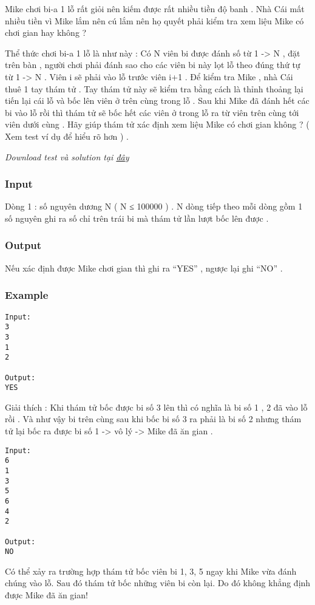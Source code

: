 



   Mike chơi bi-a 1 lỗ rất giỏi nên kiếm được rất nhiều tiền độ banh . Nhà Cái mất nhiều tiền vì Mike lắm nên cú lắm nên họ quyết phải kiểm tra xem liệu Mike có chơi gian hay không ?   


   Thể thức chơi bi-a 1 lỗ là như này : Có N viên bi được đánh số từ 1 -> N , đặt trên bàn , người chơi phải đánh sao cho các viên bi này lọt lỗ theo đúng thứ tự từ 1 -> N . Viên i sẽ phải vào lỗ trước viên i+1 . Để kiểm tra Mike , nhà Cái thuê 1 tay thám tử . Tay thám tử này sẽ kiểm tra bằng cách là thỉnh thoảng lại tiến lại cái lỗ và bốc lên viên ở trên cùng trong lỗ . Sau khi Mike đã đánh hết các bi vào lỗ rồi thì thám tử sẽ bốc hết các viên ở trong lỗ ra từ viên trên cùng tới viên dưới cùng . Hãy giúp thám tử xác định xem liệu Mike có chơi gian không ? ( Xem test ví dụ để hiểu rõ hơn ) .   





\textit{    Download test và solution tại    \href{https://vn.spoj.pl/content/cheat.zip}{     đây    }}

\subsubsection{   Input  }

   Dòng 1 : số nguyên dương N ( N ≤ 100000 ) . N dòng tiếp theo mỗi dòng gồm 1 số nguyên ghi ra số chỉ trên trái bi mà thám tử lần lượt bốc lên được .  

\subsubsection{   Output  }

   Nếu xác định được Mike chơi gian thì ghi ra “YES” , ngược lại ghi “NO” .  

\subsubsection{   Example  }
\begin{verbatim}
Input:
3
3
1
2

Output:
YES
\end{verbatim}

   Giải thích : Khi thám tử bốc được bi số 3 lên thì có nghĩa là bi số 1 , 2 đã vào lỗ rồi . Và như vậy bi trên cùng sau khi bốc bi số 3 ra phải là bi số 2 nhưng thám tử lại bốc ra được bi số 1 -> vô lý -> Mike đã ăn gian .  
\begin{verbatim}
Input:
6
1
3
5
6
4
2

Output:
NO
\end{verbatim}

   Có thể xảy ra trường hợp thám tử bốc viên bi 1, 3, 5 ngay khi Mike vừa đánh chúng vào lỗ. Sau đó thám tử bốc những viên bi còn lại. Do đó không khẳng định được Mike đã ăn gian!  
